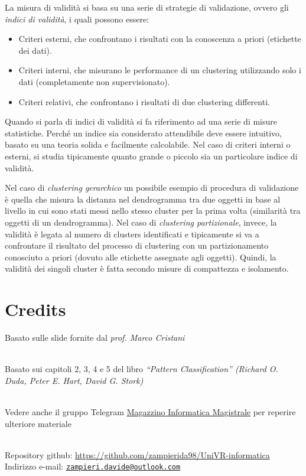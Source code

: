 \documentclass[a4paper,oneside,titlepage]{book}
\newcommand{\mail}[1]{\href{mailto:#1}{\texttt{#1}}}
\begin{document}
La misura di validità si basa su una serie di strategie di validazione, ovvero gli \textit{indici di validità}, i quali possono essere:
\begin{itemize}
    \item Criteri esterni, che confrontano i risultati con la conoscenza a priori (etichette dei dati).
    \item Criteri interni, che misurano le performance di un clustering utilizzando solo i dati (completamente non supervisionato).
    \item Criteri relativi, che confrontano i risultati di due clustering differenti.
\end{itemize}
Quando si parla di indici di validità si fa riferimento ad una serie di misure statistiche. Perché un indice sia considerato attendibile deve essere intuitivo, basato su una teoria solida e facilmente calcolabile. Nel caso di criteri interni o esterni, si studia tipicamente quanto grande o piccolo sia un particolare indice di validità.

Nel caso di \textit{clustering gerarchico} un possibile esempio di procedura di validazione è quella che misura la distanza nel dendrogramma tra due oggetti in base al livello in cui sono stati messi nello stesso cluster per la prima volta (similarità tra oggetti di un dendrogramma). Nel caso di \textit{clustering partizionale}, invece, la validità è legata al numero di clusters identificati e tipicamente si va a confrontare il risultato del processo di clustering con un partizionamento conosciuto a priori (dovuto alle etichette assegnate agli oggetti). Quindi, la validità dei singoli cluster è fatta secondo misure di compattezza e isolamento.


\backmatter
\chapter{Credits}
Basato sulle slide fornite dal \textit{prof. Marco Cristani}

\noindent
\\
Basato sui capitoli 2, 3, 4 e 5 del libro \textit{``Pattern Classification'' (Richard O. Duda, Peter E. Hart, David G. Stork)}

\noindent
\\
Vedere anche il gruppo Telegram \href{https://t.me/joinchat/AUZV-1LIz6uaZAQpSBKBkQ}{Magazzino Informatica Magistrale} per reperire ulteriore materiale

\noindent
\\
Repository github: \url{https://github.com/zampierida98/UniVR-informatica} \\
Indirizzo e-mail: \mail{zampieri.davide@outlook.com}
\end{document}

